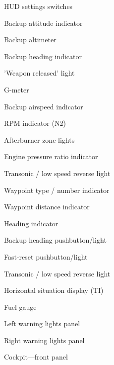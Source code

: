 \documentclass[a4paper]{report}
\begin{document}
\begin{figure}[!b]
\begin{multicols}{2}
\begin{enumerate}[nosep]
{      \item HUD settings switches
      \item Backup attitude indicator
      \item Backup altimeter
      \item Backup heading indicator
      \item 'Weapon released' light
      \item G-meter
      \item Backup airspeed indicator
      \item RPM indicator (N2)
      \item Afterburner zone lights
      \item Engine pressure ratio indicator
      \item Transonic / low speed reverse light
      \item Waypoint type / number indicator
      \item Waypoint distance indicator
    }{
      \item Heading indicator
      \item Backup heading pushbutton/light
      \item Fast-reset pushbutton/light
      \item Transonic / low speed reverse light
      \item Horizontal situation display (TI)
    }
      \item Fuel gauge
      \item Left warning lights panel
      \item Right warning lights panel
    \end{enumerate}
  \end{multicols}

  \caption{Cockpit---front panel}
  \label{fig:front-panel}
\end{figure}
\end{document}
